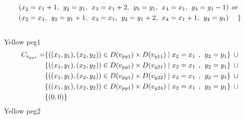 \begin{align*}
&(x_{2} = x_{1}+1,\hspace{1ex}y_{2} = y_{1},\hspace{1ex}x_{3} = x_{1}+2, \hspace{1ex}y_{3} = y_{1},\hspace{1ex}x_{4} = x_{1},\hspace{1ex}y_{4} = y_{1}-1)\hspace{1ex} or\\
&(x_{2} = x_{1},\hspace{1ex}y_{2} = y_{1}+1,\hspace{1ex}x_{3} = x_{1}, \hspace{1ex}y_{3} = y_{1}+2,\hspace{1ex}x_{4} = x_{1}+1,\hspace{1ex}y_{4} = y_{1})\hspace{3ex} \} 
\end{align*}
\\ Yellow peg1
\begin{align*}  
C_{v_{py1}} = &\{((x_{1},y_{1}),(x_{2},y_{2}))\in D(v_{py1}) \times D(v_{y11})\mid x_{2} = x_{1} \hspace{1ex} , \hspace{1ex}  y_{2} = y_{1}\}\hspace{1ex} \cup  
\\&\{((x_{1},y_{1}),(x_{2},y_{2}))\in D(v_{py1}) \times D(v_{y21})\mid x_{2} = x_{1} \hspace{1ex} , \hspace{1ex}  y_{2} = y_{1}\}\hspace{1ex} \cup 
\\&\{ ((x_{1},y_{1}),(x_{2},y_{2}))\in D(v_{py1}) \times D(v_{y22})\mid x_{2} = x_{1} \hspace{1ex} , \hspace{1ex}  y_{2} = y_{1}\}\hspace{1ex}\cup 
\\& \{((x_{1},y_{1}),(x_{2},y_{2}))\in D(v_{py1}) \times D(v_{y24})\mid x_{2} = x_{1} \hspace{1ex} , \hspace{1ex}  y_{2} = y_{1}\} \hspace{1ex}\cup
\\& \{(0,0)\}
\end{align*}
 Yellow peg2 
